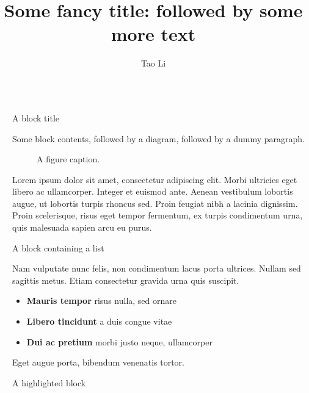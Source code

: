 \documentclass[final]{beamer}
\title{Some fancy title: followed by some more text}
\author{Tao Li}
\institute[shortinst]{Department of Electrical and Computer Engineering, New York University}
\newlength{\sepwidth}
\newlength{\colwidth}
\newcommand{\separatorcolumn}{\begin{column}{\sepwidth}\end{column}}
\begin{document}
\begin{frame}[t]
\begin{columns}[t]
\separatorcolumn

\begin{column}{\colwidth}

  \begin{block}{A block title}

    Some block contents, followed by a diagram, followed by a dummy paragraph.

    \begin{figure}
      \centering
      \caption{A figure caption.}
    \end{figure}

    Lorem ipsum dolor sit amet, consectetur adipiscing elit. Morbi ultricies
    eget libero ac ullamcorper. Integer et euismod ante. Aenean vestibulum
    lobortis augue, ut lobortis turpis rhoncus sed. Proin feugiat nibh a
    lacinia dignissim. Proin scelerisque, risus eget tempor fermentum, ex
    turpis condimentum urna, quis malesuada sapien arcu eu purus.

  \end{block}

  \begin{block}{A block containing a list}

    Nam vulputate nunc felis, non condimentum lacus porta ultrices. Nullam sed
    sagittis metus. Etiam consectetur gravida urna quis suscipit.

    \begin{itemize}
      \item \textbf{Mauris tempor} risus nulla, sed ornare
      \item \textbf{Libero tincidunt} a duis congue vitae
      \item \textbf{Dui ac pretium} morbi justo neque, ullamcorper
    \end{itemize}

    Eget augue porta, bibendum venenatis tortor.

  \end{block}

  \begin{alertblock}{A highlighted block}


\end{alertblock}
\end{column}
\end{columns}
\end{frame}
\end{document}
